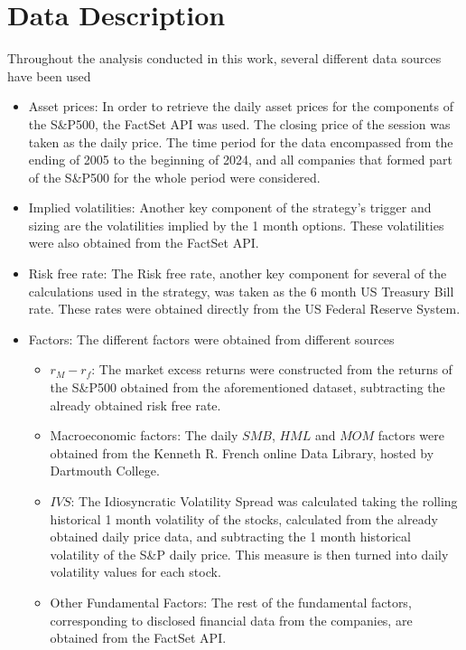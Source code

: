 \section{Data Description}
Throughout the analysis conducted in this work, several different data sources have been used
\begin{itemize}
    \item Asset prices: In order to retrieve the daily asset prices for the components of the S\&P500, the FactSet API was used. The closing price of the session was taken as the daily price. The time period for the data encompassed from the ending of 2005 to the beginning of 2024, and all companies that formed part of the S\&P500 for the whole period were considered. 
    \item Implied volatilities: Another key component of the strategy's trigger and sizing are the volatilities implied by the 1 month options. These volatilities were also obtained from the FactSet API. 
    \item Risk free rate: The Risk free rate, another key component for several of the calculations used in the strategy, was taken as the 6 month US Treasury Bill rate. These rates were obtained directly from the US Federal Reserve System.
    \item Factors: The different factors were obtained from different sources
    \begin{itemize}
        \item $r_M-r_f$: The market excess returns were constructed from the returns of the S\&P500 obtained from the aforementioned dataset, subtracting the already obtained risk free rate.
        \item Macroeconomic factors: The daily $SMB$, $HML$ and $MOM$ factors were obtained from the Kenneth R. French online Data Library, hosted by Dartmouth College.
        \item $IVS$: The Idiosyncratic Volatility Spread was calculated taking the rolling historical 1 month volatility of the stocks, calculated from the already obtained daily price data, and subtracting the 1 month historical volatility of the S\&P daily price. This measure is then turned into daily volatility values for each stock. 
        \item Other Fundamental Factors: The rest of the fundamental factors, corresponding to disclosed financial data from the companies, are obtained from the FactSet API. 
    \end{itemize}
\end{itemize}